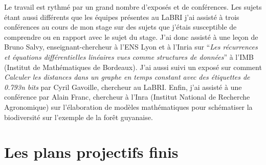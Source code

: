 \documentclass[a4paper]{article}
\begin{document}
Le travail est rythmé par un grand nombre d'exposés et de conférences. Les sujets étant aussi différents que les équipes présentes au LaBRI j'ai assisté à trois conférences au cours de mon stage sur des sujets que j'étais susceptible de comprendre ou en rapport avec le sujet du stage. J'ai donc assisté à une leçon de Bruno Salvy, enseignant-chercheur à l'ENS Lyon et à l'Inria sur ``\textit{Les récurrences et équations différentielles linéaires vues comme structures de données}'' à l'IMB (Institut de Mathématiques de Bordeaux). J'ai aussi suivi un exposé sur comment \textit{Calculer les distances dans un graphe en temps constant avec des étiquettes de 0.793n bits} par Cyril Gavoille, chercheur au LaBRI. Enfin, j'ai assisté à une conférence par Alain Franc, chercheur à l'Inra (Institut National de Recherche Agronomique) sur l'élaboration de modèles mathématiques pour schématiser la biodiversité sur l'exemple de la forêt guyanaise.

\newpage
\section{Les plans projectifs finis}
\end{document}
